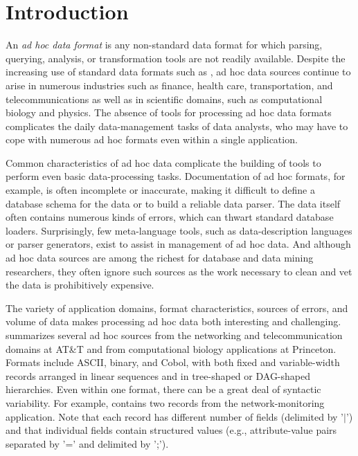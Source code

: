 \section{Introduction}

\label{sec:intro}


An {\em ad hoc data format} is any non-standard data format for which
parsing, querying, analysis, or transformation tools are not readily
available.  Despite the increasing use of standard data formats such
as \xml{}, ad hoc data sources continue to arise in numerous
industries such as finance, health care, transportation, and
telecommunications as well as in scientific domains, such as
computational biology and physics.  The absence of tools for
processing ad hoc data formats complicates the daily data-management
tasks of data analysts, who may have to cope with numerous ad
hoc formats even within a single application.  

Common characteristics of ad hoc data complicate the building of tools
to perform even basic data-processing tasks.  Documentation of ad hoc
formats, for example, is often incomplete or inaccurate, making it
difficult to define a database schema for the data or to build a
reliable data parser.  The data itself often contains numerous kinds
of errors, which can thwart standard database loaders.  Surprisingly,
few meta-language tools, such as data-description languages or parser
generators, exist to assist in management of ad hoc data.  And
although ad hoc data sources are among the richest for database and
data mining researchers, they often ignore such sources as the work
necessary to clean and vet the data is prohibitively expensive.


The variety of application domains, format characteristics, sources of
errors, and volume of data makes processing ad hoc data both
interesting and challenging.   summarizes
several ad hoc sources from the networking and telecommunication
domains at AT\&T and from computational biology applications at
Princeton.  Formats include ASCII, binary, and Cobol, with both fixed
and variable-width records arranged in linear sequences and in
tree-shaped or DAG-shaped hierarchies.  Even within one format, there
can be a great deal of syntactic variability.  For example,
 contains two records from the
network-monitoring application.  Note that each record has different
number of fields (delimited by '$|$') and that individual fields contain
structured values (e.g., attribute-value pairs separated by '=' and
delimited by ';').

